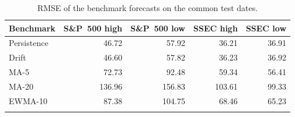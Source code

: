 \begin{table}[ht]
\caption{RMSE of the benchmark forecasts on the common test dates.}
\label{tab:baselines}
\centering
\begin{tabular}{@{}lrrrr@{}}
\toprule
Benchmark & S\&P~500 high & S\&P~500 low & SSEC high & SSEC low \\
\midrule
Persistence & 46.72 & 57.92 & 36.21 & 36.91 \\
Drift & 46.60 & 57.82 & 36.23 & 36.92 \\
MA-5 & 72.73 & 92.48 & 59.34 & 56.41 \\
MA-20 & 136.96 & 156.83 & 103.61 & 99.33 \\
EWMA-10 & 87.38 & 104.75 & 68.46 & 65.23 \\
\botrule
\end{tabular}
\end{table}
